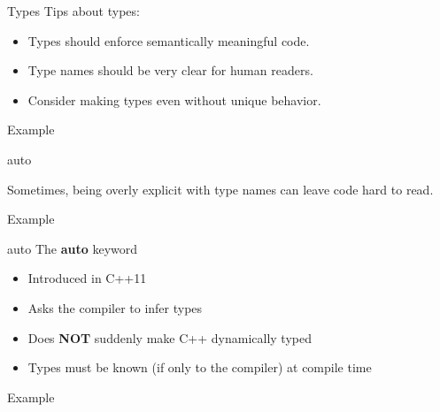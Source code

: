\documentclass{beamer}
\begin{document}
	
	\begin{frame}{Types}
		Tips about types:
		\begin{itemize}
			\item Types should enforce semantically meaningful code.
			\item Type names should be very clear for human readers.
			\item Consider making types even without unique behavior.
		\end{itemize}
		\bigskip
		\begin{exampleblock}{Example}
			\lstI
		\end{exampleblock}
	\end{frame}
	
	
	\begin{frame}{auto}
		\begin{center}
			Sometimes, being overly explicit with type names can leave code hard to read.
		\end{center}
		\bigskip
		\begin{exampleblock}{Example}
			\lstI
		\end{exampleblock}
		
	\end{frame}
	
	
	\begin{frame}{auto}
		The \textbf{auto} keyword
		\begin{itemize}
			\item Introduced in C++11
			\item Asks the compiler to infer types
			\item Does \textbf{NOT} suddenly make C++ dynamically typed
			\item Types must be known (if only to the compiler) at compile time
		\end{itemize}
		
		\begin{exampleblock}{Example}
		\lstI
		\end{exampleblock}
		
	\end{frame}
	
\end{document}
